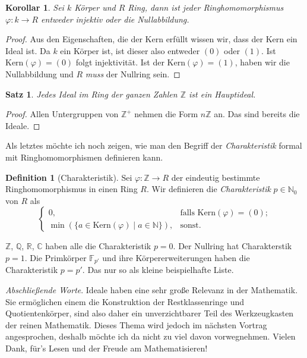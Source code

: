 \documentclass{article}
\newtheorem*{satz}{Satz}
\newtheorem*{cor}{Korollar}
\theoremstyle{definition}
\newtheorem*{definition}{Definition}
\theoremstyle{remark}
\begin{document}
\begin{cor}
Sei $k$ Körper und $R$ Ring, dann ist jeder Ringhomomorphismus $\varphi:k\to R$ entweder injektiv oder die
Nullabbildung.
\end{cor}
\begin{proof}
Aus den Eigenschaften, die der Kern erfüllt wissen wir, dass der Kern ein Ideal ist. Da $k$ ein Körper ist, ist
dieser also entweder $(0)$ oder $(1)$. Ist $\text{Kern}(\varphi)=(0)$ folgt injektivität.
Ist der $\text{Kern}(\varphi)=(1)$, haben wir die Nullabbildung und $R$ \emph{muss} der Nullring sein.
\end{proof}

\begin{satz}
Jedes Ideal im Ring der ganzen Zahlen $\mathbb Z$ ist ein Hauptideal.
\end{satz}
\begin{proof}
Allen Untergruppen von $\mathbb Z^+$ nehmen die Form $n\mathbb Z$ an. Das sind bereits die Ideale.
\end{proof}

Als letztes möchte ich noch zeigen, wie man den Begriff der \emph{Charakteristik} formal mit Ringhomomorphismen
definieren kann.

\begin{definition}[Charakteristik]
Sei $\varphi: \mathbb Z\to R$ der eindeutig bestimmte Ringhomomorphismus in einen Ring $R$. Wir definieren die
\emph{Charakteristik} $p\in\mathbb N_0$ von $R$ als
\[\begin{cases}
    0, &\text{falls Kern}(\varphi)=(0); \\
    \min\left(\{a\in \text{Kern}(\varphi) \mid a\in\mathbb N\}\right), &\text{sonst.}
\end{cases}\]
\end{definition}
$\mathbb Z$, $\mathbb Q$, $\mathbb R$, $\mathbb C$ haben alle die Charakteristik $p=0$.
Der Nullring hat Charakterstik $p=1$. Die Primkörper $\mathbb F_{p'}$ und ihre Körpererweiterungen haben
die Charakteristik $p=p'$. Das nur so als kleine beispielhafte Liste.

\vspace{4em}
\emph{Abschließende Worte}.
Ideale haben eine sehr große Relevanz in der Mathematik. Sie ermöglichen einem die Konstruktion der
Restklassenringe und Quotientenkörper, sind also daher ein unverzichtbarer Teil des
Werkzeugkasten der reinen Mathematik. Dieses Thema wird jedoch im nächsten Vortrag angesprochen, deshalb
möchte ich da nicht zu viel davon vorwegnehmen. Vielen Dank, für's Lesen und der Freude am Mathematisieren!
\end{document}
